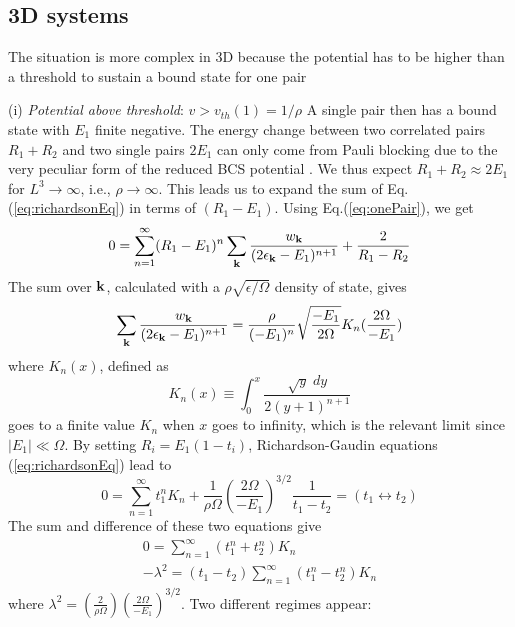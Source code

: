 \documentclass[5p,twocolumn]{elsarticle}
\begin{document}
\subsection{3D systems}

The situation is more complex in 3D because the potential has to be higher than a threshold to sustain a bound state for one pair

(i) {\it Potential above threshold}: $v>v_{th}(1)=1/\rho$ A single pair then has a bound state with $E_1$  finite negative. The energy change between two correlated pairs $R_{1}+R_{2}$ and two single pairs  $2E_{1}$ can only come from Pauli blocking due to the very peculiar form of the reduced BCS potential \cite{moth}. We thus expect $R_1+R_2\approx2E_1$ for $L^3\rightarrow\infty$, i.e., $\rho\rightarrow\infty$. This leads us to expand the sum of Eq.(\ref{eq:richardsonEq}) in terms of $(R_{1}-E_{1})$.  Using Eq.(\ref{eq:onePair}), we get
\begin{equation}
0=\sum_{n=1}^{\infty}(R_{1}-E_{1})^{n}\sum_{\mathbf{k}}\frac{w_{\mathbf{k}}}{(2\epsilon_{\mathbf{k}}-E_1)^{n+1}}+\frac{2}{R_1-R_2}
\end{equation}
The sum over $\mathbf{k}$, calculated with a $\rho\sqrt{\epsilon/\Omega}$ density of state, gives
\begin{equation}
\sum_{\mathbf{k}}\frac{w_{\mathbf{k}}}{(2\epsilon_{\mathbf{k}}-E_1)^{n+1}}=\\\frac{\rho}{(-E_{1})^{n}}\sqrt{\frac{-E_{1}}{2\Omega}}K_{n}(\frac{2\Omega}{-E_{1}})
\end{equation}
where $K_{n}(x)$, defined as
\begin{equation}
K_{n}(x)\equiv\int_{0}^{x}\frac{\sqrt{y}\;dy}{2(y+1)^{n+1}}
\end{equation}
goes to a finite value $K_{n}$ when $x$ goes to infinity, which is the relevant limit since $|E_1|\ll\Omega$.
By setting
$R_{i}=E_{1}(1-t_{i})$, Richardson-Gaudin equations (\ref{eq:richardsonEq})  lead to
\begin{equation}
0=\sum_{n=1}^{\infty}t_{1}^{n}K_{n}+\frac{1}{\rho\Omega}\left(\frac{2\Omega}{-E_{1}}\right)^{3/2}\frac{1}{t_1-t_2}=(t_{1}\leftrightarrow{}t_{2})
\end{equation}
The sum and difference of these two equations give
\begin{gather}
0=\sum_{n=1}^{\infty}(t_{1}^{n}+t_{2}^{n})K_{n}\label{eq:t2}\\
-\lambda^{2}=(t_{1}-t_{2})\sum_{n=1}^{\infty}(t_{1}^{n}-t_{2}^{n})K_{n}\label{eq:t1}
\end{gather}
where $\lambda^2=(\frac{2}{\rho\Omega})(\frac{2\Omega}{-E_{1}})^{3/2}$.
Two different regimes appear: 
\end{document}
